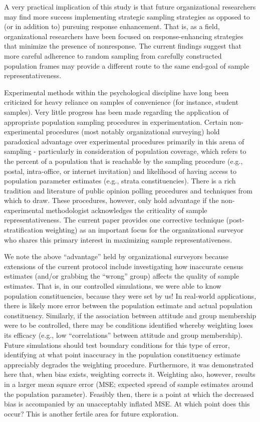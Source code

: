 \documentclass[
  man,mask]{apa7}
\begin{document}
A very practical implication of this study is that future organizational researchers may find more success implementing strategic sampling strategies as opposed to (or in addition to) pursuing response enhancement. That is, as a field, organizational researchers have been focused on response-enhancing strategies that minimize the presence of nonresponse. The current findings suggest that more careful adherence to random sampling from carefully constructed population frames may provide a different route to the same end-goal of sample representativeness.

Experimental methods within the psychological discipline have long been criticized for heavy reliance on samples of convenience (for instance, student samples). Very little progress has been made regarding the application of appropriate population sampling procedures in experimentation. Certain non-experimental procedures (most notably organizational surveying) hold paradoxical advantage over experimental procedures primarily in this arena of sampling - particularly in consideration of population coverage, which refers to the percent of a population that is reachable by the sampling procedure (e.g., postal, intra-office, or internet invitation) and likelihood of having access to population parameter estimates (e.g., strata constituencies). There is a rich tradition and literature of public opinion polling procedures and techniques from which to draw. These procedures, however, only hold advantage if the non-experimental methodologist acknowledges the criticality of sample representativeness. The current paper provides one corrective technique (post-stratification weighting) as an important focus for the organizational surveyor who shares this primary interest in maximizing sample representativeness.

We note the above ``advantage'' held by organizational surveyors because extensions of the current protocol include investigating how inaccurate census estimates (and/or grabbing the ``wrong'' group) affects the quality of sample estimates. That is, in our controlled simulations, we were able to know population constituencies, because they were set by us! In real-world applications, there is likely more error between the population estimate and actual population constituency. Similarly, if the association between attitude and group membership were to be controlled, there may be conditions identified whereby weighting loses its efficacy (e.g., low ``correlations'' between attitude and group membership). Future simulations should test boundary conditions for this type of error, identifying at what point inaccuracy in the population constituency estimate appreciably degrades the weighting procedure. Furthermore, it was demonstrated here that, when bias exists, weighting corrects it. Weighting also, however, results in a larger mean square error (MSE; expected spread of sample estimates around the population parameter). Feasibly then, there is a point at which the decreased bias is accompanied by an unacceptably inflated MSE. At which point does this occur? This is another fertile area for future exploration.
\end{document}
